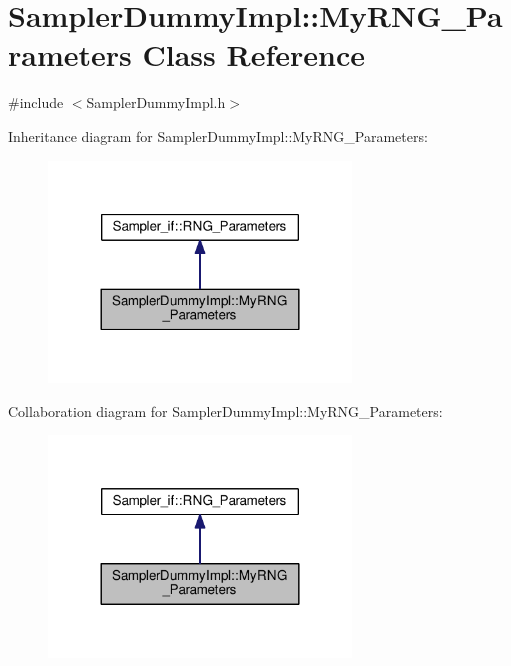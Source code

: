 \hypertarget{class_sampler_dummy_impl_1_1_my_r_n_g___parameters}{}\section{Sampler\+Dummy\+Impl\+:\+:My\+R\+N\+G\+\_\+\+Parameters Class Reference}
\label{class_sampler_dummy_impl_1_1_my_r_n_g___parameters}


{\ttfamily \#include $<$Sampler\+Dummy\+Impl.\+h$>$}



Inheritance diagram for Sampler\+Dummy\+Impl\+:\+:My\+R\+N\+G\+\_\+\+Parameters\+:
\nopagebreak
\begin{figure}[H]
\begin{center}
\leavevmode
\includegraphics[width=228pt]{class_sampler_dummy_impl_1_1_my_r_n_g___parameters__inherit__graph}
\end{center}
\end{figure}


Collaboration diagram for Sampler\+Dummy\+Impl\+:\+:My\+R\+N\+G\+\_\+\+Parameters\+:
\nopagebreak
\begin{figure}[H]
\begin{center}
\leavevmode
\includegraphics[width=228pt]{class_sampler_dummy_impl_1_1_my_r_n_g___parameters__coll__graph}
\end{center}
\end{figure}
